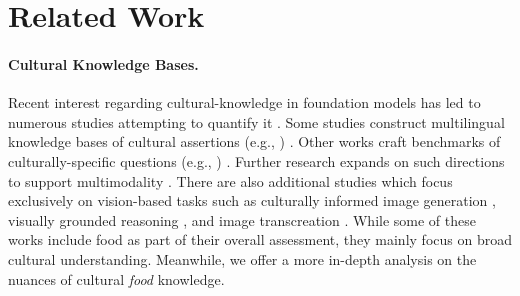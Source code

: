 \section{Related Work}
\label{sec:related_work}

\paragraph{Cultural Knowledge Bases.} 
Recent interest regarding cultural-knowledge in foundation models has led to numerous studies attempting to quantify it \cite{hershcovich2022challengesstrategiescrossculturalnlp, adilazuarda-etal-2024-towards, liu2024culturallyawareadaptednlp}. Some studies construct multilingual knowledge bases of cultural assertions (e.g., \textit{}) \cite{Nguyen_2023, Nguyen_2024, fung2024massivelymulticulturalknowledgeacquisition}. Other works craft benchmarks of culturally-specific questions (e.g., \textit{}) \cite{yin2022geomlama, myung2024blendbenchmarkllmseveryday, shen-etal-2024-understanding, arora2024calmqaexploringculturallyspecific}. Further research expands on such directions to support multimodality \cite{ramaswamy2023geodegeographicallydiverseevaluation, liu2023cultural}. There are also additional studies which focus exclusively on vision-based tasks such as culturally informed image generation \cite{bhatia2024local, karamolegkou2024vision, kannen2024beyond}, visually grounded reasoning \cite{schneider2024m}, and image transcreation \cite{khanuja2024image}. While some of these works include food as part of their overall assessment, they mainly focus on broad cultural understanding. Meanwhile, we offer a more in-depth analysis on the nuances of cultural \textit{food} knowledge.


